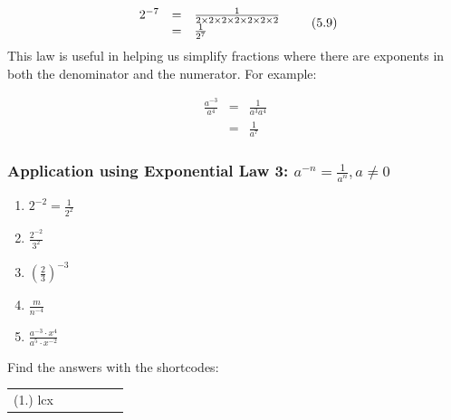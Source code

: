     \begin{equation}
    \begin{array}{ccc}\hfill {2}^{-7}& =& \frac{1}{2\ensuremath{\times}2\ensuremath{\times}2\ensuremath{\times}2\ensuremath{\times}2\ensuremath{\times}2\ensuremath{\times}2}\hfill \\ & =& \frac{1}{{2}^{7}}\hfill \end{array}\tag{5.9}
      \end{equation}
\label{m38359*eip-294}This law is useful in helping us simplify fractions where there are exponents in both the denominator and the numerator. For example:
\label{m38359*id7902}\nopagebreak\noindent{}

    \begin{equation}
    \begin{array}{ccc}\frac{{a}^{-3}}{{a}^{4}}& =& \frac{1}{{a}^{3}{a}^{4}}\\ & =& \frac{1}{{a}^{7}}\end{array}\tag{5.10}
      \end{equation}
\par \label{m38359*secfhsst!!!underscore!!!id835}
            \subsubsection{  Application using Exponential Law 3: ${a}^{-n}=\frac{1}{{a}^{n}},a\ne 0$ }
            \nopagebreak
        \label{m38359*id64771}\begin{enumerate}[noitemsep, label=\textbf{\arabic*}. ] 
            \label{m38359*uid18}\item 
            ${2}^{-2}=\frac{1}{{2}^{2}}$
      \label{m38359*uid19}\item 
        $\frac{{2}^{-2}}{{3}^{2}}$
      \label{m38359*uid20}\item 
        ${\left(\frac{2}{3}\right)}^{-3}$
      \label{m38359*uid21}\item 
        $\frac{m}{{n}^{-4}}$
      \label{m38359*uid22}\item 
        $\frac{{a}^{-3}\ensuremath{\cdot}{x}^{4}}{{a}^{5}\ensuremath{\cdot}{x}^{-2}}$
\newline
\newline
          \end{enumerate}
      \label{m38359*uid23}
\par {} Find the answers with the shortcodes:
 \par \begin{tabular}[h]{cccccc}
 (1.) lcx  & \end{tabular}

